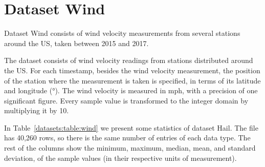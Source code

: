 
\vspace{-15pt}
\section{Dataset Wind}
\label{datasets:wind}

Dataset Wind \cite{dataset:spc} consists of wind velocity measurements from several stations around the US, taken between 2015 and 2017. \SPCDef


The dataset consists of wind velocity readings from stations distributed around the US. For each timestamp, besides the wind velocity measurement, the position of the station where the measurement is taken is specified, in terms of its latitude and longitude (°). The wind velocity is measured in mph, with a precision of one significant figure. Every sample value is transformed to the integer domain by multiplying it by 10.


In Table~\ref{datasets:table:wind} we present some statistics of dataset Hail. \SPCTable The file has 40,260 rows, so there is the same number of entries of each data type. The rest of the columns show the minimum, maximum, median, mean, and standard deviation, of the sample values (in their respective units of measurement).


